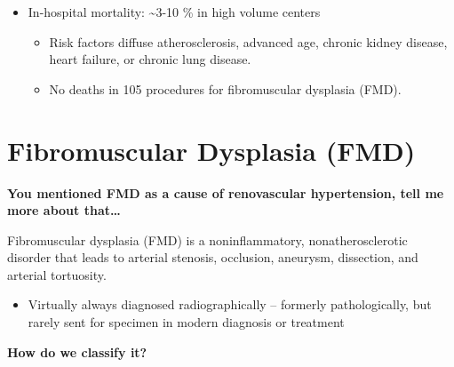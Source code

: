 \documentclass[
]{book}
\providecommand{\tightlist}{%
  \setlength{\itemsep}{0pt}\setlength{\parskip}{0pt}}
\begin{document}
\begin{itemize}
\item
  In-hospital mortality: \textasciitilde3-10 \% in high volume centers

  \begin{itemize}
  \item
    Risk factors diffuse atherosclerosis, advanced age, chronic
    kidney disease, heart failure, or chronic lung disease.
  \item
    No deaths in 105 procedures for fibromuscular dysplasia (FMD).
  \end{itemize}
\end{itemize}

\hypertarget{fibromuscular-dysplasia-fmd}{%
\section{Fibromuscular Dysplasia (FMD)}\label{fibromuscular-dysplasia-fmd}}

\textbf{You mentioned FMD as a cause of renovascular hypertension, tell me
more about that\ldots{}}

Fibromuscular dysplasia (FMD) is a noninflammatory, nonatherosclerotic
disorder that leads to arterial stenosis, occlusion, aneurysm,
dissection, and arterial tortuosity.

\begin{itemize}
\tightlist
\item
  Virtually always diagnosed radiographically -- formerly
  pathologically, but rarely sent for specimen in modern diagnosis or
  treatment
\end{itemize}

\textbf{How do we classify it?}
\end{document}
